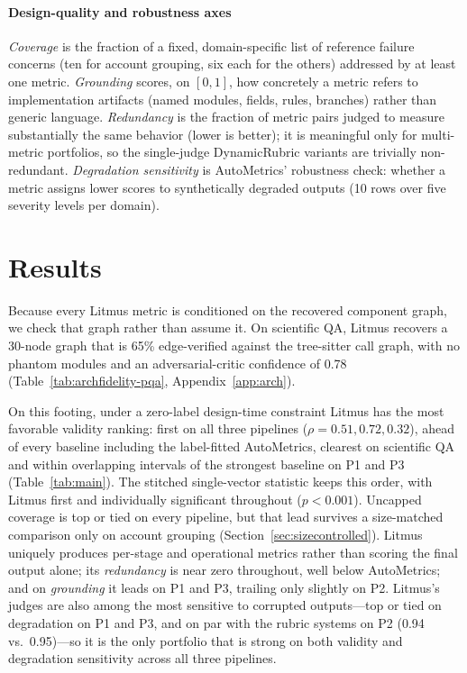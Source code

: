 \documentclass[11pt]{article}
\begin{document}
\paragraph{Design-quality and robustness axes} \emph{Coverage} is the fraction of a fixed, domain-specific list of reference failure concerns (ten for account grouping, six each for the others) addressed by at least one metric. \emph{Grounding} scores, on $[0,1]$, how concretely a metric refers to implementation artifacts (named modules, fields, rules, branches) rather than generic language. \emph{Redundancy} is the fraction of metric pairs judged to measure substantially the same behavior (lower is better); it is meaningful only for multi-metric portfolios, so the single-judge DynamicRubric variants are trivially non-redundant. \emph{Degradation sensitivity} is AutoMetrics' robustness check: whether a metric assigns lower scores to synthetically degraded outputs (10 rows over five severity levels per domain).

\section{Results}
\label{sec:results}

Because every Litmus metric is conditioned on the recovered component graph, we check that graph rather than assume it. On scientific QA, Litmus recovers a 30-node graph that is 65\% edge-verified against the tree-sitter call graph, with no phantom modules and an adversarial-critic confidence of 0.78 (Table~\ref{tab:archfidelity-pqa}, Appendix~\ref{app:arch}). 

On this footing, under a zero-label design-time constraint Litmus has the most favorable validity ranking: first on all three pipelines ($\rho=0.51, 0.72, 0.32$), ahead of every baseline including the label-fitted AutoMetrics, clearest on scientific QA and within overlapping intervals of the strongest baseline on P1 and P3 (Table~\ref{tab:main}). The stitched single-vector statistic keeps this order, with Litmus first and individually significant throughout ($p<0.001$). Uncapped coverage is top or tied on every pipeline, but that lead survives a size-matched comparison only on account grouping (Section~\ref{sec:sizecontrolled}). Litmus uniquely produces per-stage and operational metrics rather than scoring the final output alone; its \emph{redundancy} is near zero throughout, well below AutoMetrics; and on \emph{grounding} it leads on P1 and P3, trailing only slightly on P2. Litmus's judges are also among the most sensitive to corrupted outputs---top or tied on degradation on P1 and P3, and on par with the rubric systems on P2 (0.94 vs.\ 0.95)---so it is the only portfolio that is strong on both validity and degradation sensitivity across all three pipelines.
\end{document}
